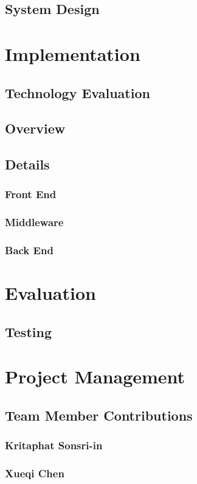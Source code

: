 \documentclass[11pt, a4paper]{article}
\begin{document}
\subsection{System Design}

\section{Implementation}
\subsection{Technology Evaluation}
\subsection{Overview}
\subsection{Details}
\subsubsection{Front End}
\subsubsection{Middleware}
\subsubsection{Back End}

\section{Evaluation}
\subsection{Testing}

\section{Project Management}
\subsection{Team Member Contributions}
\subsubsection{Kritaphat Sonsri-in}
\subsubsection{Xueqi Chen}
\end{document}
